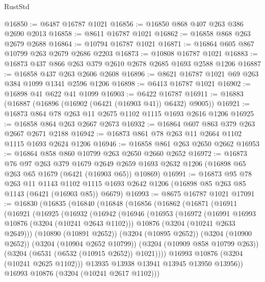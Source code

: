 \begin{lexlean}{RustStd}
\begin{coremodule}
@16850 := @6487 @16787 @1021
@16856 := @16850 @868 @407 @263 @386 @2690 @2013
@16858 := @8611 @16787 @1021
@16862 := @16858 @868 @263 @2679 @2688
@16864 := @10794 @16787 @1021
@16871 := @16864 @605 @867 @10799 @263 @2679 @2686 @2203
@16873 := @10808 @16787 @1021
@16883 := @16873 @437 @866 @263 @379 @2610 @2678 @2685 @1693 @2588 @1206
@16887 := @16858 @437 @263 @2606 @2608
@16896 := @8621 @16787 @1021 @69 @263 @384 @1099 @1341 @2596 @1206
@16898 := @6413 @16787 @1021
@16902 := @16898 @41 @622 @41 @1099
@16903 := @6422 @16787
@16911 := @16883 (@16887 (@16896 (@16902 (@6421 (@16903 @41)) @6432) @9005))
@16921 := @16873 @864 @78 @263 @11 @2675 @1102 @1115 @1693 @2616 @1206
@16925 := @16858 @864 @263 @2667 @2673
@16932 := @16864 @607 @863 @379 @263 @2667 @2671 @2188
@16942 := @16873 @861 @78 @263 @11 @2664 @1102 @1115 @1693 @2624 @1206
@16946 := @16858 @861 @263 @2650 @2662
@16953 := @16864 @858 @860 @10799 @263 @2650 @2660 @2652
@16972 := @16873
    @76
    @97
    @263
    @379
    @1679
    @2649
    @2659
    @1693
    @2632
    @1206
    (@16898 @65 @263 @65 @1679 (@6421 (@16903 @65)) @10869)
@16991 := @16873
    @95
    @78
    @263
    @11
    @1143
    @1102
    @1115
    @1693
    @2642
    @1206
    (@16898 @85 @263 @85 @1143 (@6421 (@16903 @85)) @6679)
@16993 := @8675 @16787 @1021
@17091 := @16830
    (@16835
      (@16840
        (@16848
          (@16856
            (@16862
              (@16871
                (@16911
                  (@16921
                    (@16925
                      (@16932
                        (@16942
                          (@16946
                            (@16953
                              (@16972
                                (@16991 @16993 @10876 (@3204 (@10241 @2643 @1102)))
                                @10876
                                (@3204 (@10241 @2633 @2649)))
                              (@10890 (@10891 @2652))
                              (@3204 (@10895 @2652))
                              (@3204 (@10900 @2652))
                              (@3204 (@10904 @2652 @10799))
                              (@3204 (@10909 @858 @10799 @263))
                              (@3204 (@6531 (@6532 (@10915 @2652)) @1021))))
                          @16993
                          @10876
                          (@3204 (@10241 @2625 @1102)))
                        @13935
                        @13938
                        @13941
                        @13945
                        @13950
                        @13956))
                    @16993
                    @10876
                    (@3204 (@10241 @2617 @1102)))

\end{coremodule}
\end{lexlean}
